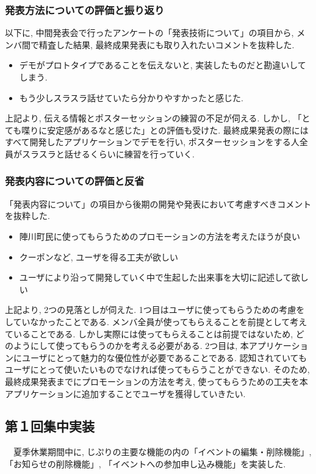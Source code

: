 \subsubsection{発表方法についての評価と振り返り}
以下に, 中間発表会で行ったアンケートの「発表技術について」の項目から, メンバ間で精査した結果, 最終成果発表にも取り入れたいコメントを抜粋した.
\begin{itemize}
  \item デモがプロトタイプであることを伝えないと, 実装したものだと勘違いしてしまう.
  \item もう少しスラスラ話せていたら分かりやすかったと感じた.
\end{itemize}
    上記より, 伝える情報とポスターセッションの練習の不足が伺える.
    しかし, 「とても喋りに安定感があるなと感じた」との評価も受けた. 最終成果発表の際にはすべて開発したアプリケーションでデモを行い,
    ポスターセッションをする人全員がスラスラと話せるくらいに練習を行っていく.

\subsubsection{発表内容についての評価と反省}
    「発表内容について」の項目から後期の開発や発表において考慮すべきコメントを抜粋した.
\begin{itemize}
  \item 陣川町民に使ってもらうためのプロモーションの方法を考えたほうが良い
  \item クーポンなど, ユーザを得る工夫が欲しい
  \item ユーザにより沿って開発していく中で生起した出来事を大切に記述して欲しい
\end{itemize}
    上記より, 2つの見落としが伺えた. 1つ目はユーザに使ってもらうための考慮をしていなかったことである.
    メンバ全員が使ってもらえることを前提として考えていることである. しかし実際には使ってもらえることは前提ではないため,
    どのようにして使ってもらうのかを考える必要がある. 2つ目は, 本アプリケーションにユーザにとって魅力的な優位性が必要であることである.
    認知されていてもユーザにとって使いたいものでなければ使ってもらうことができない. そのため, 最終成果発表までにプロモーションの方法を考え,
    使ってもらうための工夫を本アプリケーションに追加することでユーザを獲得していきたい.


\subsection{第１回集中実装}
　夏季休業期間中に, じぷりの主要な機能の内の「イベントの編集・削除機能」, 「お知らせの削除機能」, 「イベントへの参加申し込み機能」を実装した.

